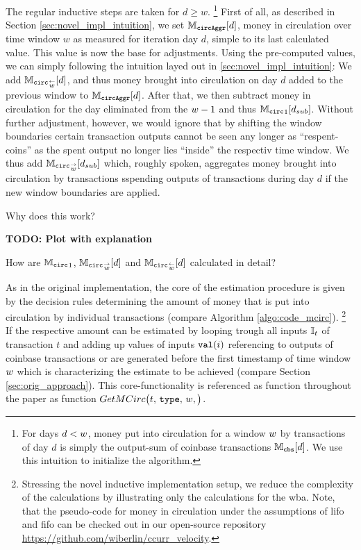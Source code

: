 The regular inductive steps are taken for \(d \geq w \).%
\footnote{
For days \(d < {w} \), money put into circulation for a window \({w}\) by transactions of day \(d\) is simply the output-sum of coinbase transactions \({\mathbb{M}_{{\mathtt{cbs}}}}[d]\). %
We use this intuition to initialize the algorithm.} %
First of all, as described in Section \ref{sec:novel_impl_intuition}, we set \({\mathbb{M}_{\mathtt{circAggr}}}[d]\), money in circulation over time window \(w\) as measured for iteration day \(d\), simple to its last calculated value. %
This value is now the base for adjustments. %
Using the pre-computed values, we can simply following the intuition layed out in \ref{sec:novel_impl_intuition}: %
We add \({{\mathbb{M}_{\mathtt{circ}}}_{\overset{\leftarrow}{{w}}}}[d]\), and thus money brought into circulation on day \(d\) added to the previous window to \({\mathbb{M}_{\mathtt{circAggr}}}[d]\). %
After that, we then subtract money in circulation for the day eliminated from the \({w} - 1\) and thus \({\mathbb{M}_{\mathtt{circ}}}_{1}[d_{sub}]\). %
Without further adjustment, however, we would ignore that by shifting the window boundaries certain transaction outputs cannot be seen any longer as ``respent-coins'' as the spent output no longer lies ``inside'' the respectiv time window. %
We thus add \( {{\mathbb{M}_{\mathtt{circ}}}_{\overset{\rightarrow}{{w}}}}[d_{sub}] \) which, roughly spoken, aggregates money brought into circulation by transactions sspending outputs of transactions during day \(d\) if the new window boundaries are applied. %

Why does this work?

\textbf{TODO: Plot with explanation}

How are \({\mathbb{M}_{\mathtt{circ}}}_{1}\), \( {{\mathbb{M}_{\mathtt{circ}}}_{\overset{\rightarrow}{{w}}}}[d] \) and \( {{\mathbb{M}_{\mathtt{circ}}}_{\overset{\leftarrow}{{w}}}}[d] \) calculated in detail? %

As in the original implementation, the core of the estimation procedure is given by the decision rules determining the amount of money that is put into circulation by individual transactions (compare Algorithm \ref{algo:code_mcirc}).%
\footnote{Stressing the novel inductive implementation setup, we reduce the complexity of the calculations by illustrating only the calculations for the \ac{wba}. %
Note, that the pseudo-code for money in circulation under the assumptions of \ac{lifo} and \ac{fifo} can be checked out in our open-source repository \url{https://github.com/wiberlin/ccurr_velocity}.
}
If the respective amount can be estimated by looping trough all inputs \({\mathbb{I}}_{t}\) of transaction \(t\) and adding up values of inputs \({\mathtt{val}}(i)\) referencing to outputs of coinbase transactions or are generated before the first timestamp of time window \({w}\) which is characterizing the estimate to be achieved (compare Section \ref{sec:orig_approach}). %
This core-functionality is referenced as function throughout the paper as function \(GetMCirc\bigl(t,\,{\mathtt{type}},\,{w},\bigr)\). %

